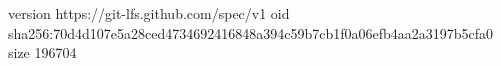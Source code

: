 version https://git-lfs.github.com/spec/v1
oid sha256:70d4d107e5a28ced4734692416848a394c59b7cb1f0a06efb4aa2a3197b5cfa0
size 196704
